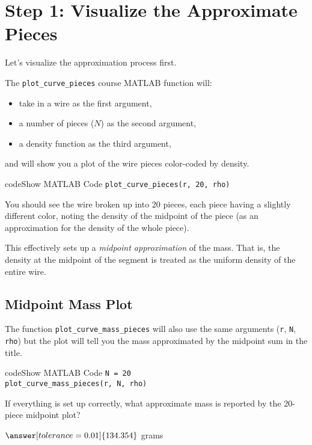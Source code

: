 \documentclass{ximera}
\begin{document}
\section*{Step 1: Visualize the Approximate Pieces}

Let's visualize the approximation process first. 

The \texttt{plot\_curve\_pieces} course MATLAB function will:
\begin{itemize}
\item take in a wire as the first argument,
\item a number of pieces ($N$) as the second argument,
\item a density function as the third argument,
\end{itemize}
and will show you a plot of the wire pieces color-coded by density.

\begin{expandable}{code}{Show MATLAB Code}
\texttt{plot\_curve\_pieces(r, 20, rho)}
\end{expandable}

You should see the wire broken up into 20 pieces, each piece having a slightly different color, noting the density of the midpoint of the piece (as an approximation for the density of the whole piece).

This effectively sets up a \emph{midpoint approximation} of the mass. That is, the density at the midpoint of the segment is treated as the uniform density of the entire wire.

\subsection*{Midpoint Mass Plot}

The function \texttt{plot\_curve\_mass\_pieces} will also use the same arguments (\texttt{r}, \texttt{N}, \texttt{rho}) but the plot will tell you the mass approximated by the midpoint sum in the title.

\begin{expandable}{code}{Show MATLAB Code}
\texttt{N = 20}\\
\texttt{plot\_curve\_mass\_pieces(r, N, rho)}
\end{expandable}

\begin{problem}
If everything is set up correctly, what approximate mass is reported by the 20-piece midpoint plot? 

$\answer[tolerance=0.01]{134.354}$ grams
\end{problem}
\end{document}
